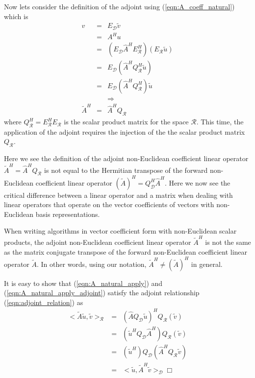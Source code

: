 Now lets consider the definition of the adjoint using (\ref{eqn:A_coeff_natural}) which is
%
\begin{eqnarray}
v
& = & E_{\mathcal{D}} \tilde{v} \nonumber \\
& = & A^H u \nonumber \\
& = & ( E_{\mathcal{D}} \hat{A}^H E_{\mathcal{R}}^H ) ( E_{\mathcal{R}} \tilde{u} ) \nonumber \\
& = & E_{\mathcal{D}} ( \hat{A}^H Q_{\mathcal{R}}^H \tilde{u} ) \nonumber \\
& = & E_{\mathcal{D}} ( \hat{A}^H Q_{\mathcal{R}}^H ) \tilde{u} \nonumber \\
&  & \Rightarrow \nonumber \\
\tilde{A}^H & = & \hat{A}^H Q_{\mathcal{R}}
\label{eqn:A_natural_apply_adjoint}
\end{eqnarray}
%
where $Q_{\mathcal{R}}^H = E_{\mathcal{R}}^H E_{\mathcal{R}}$ is the scalar
product matrix for the space $\mathcal{R}$.  This time, the application of the
adjoint requires the injection of the the scalar product matrix
$Q_{\mathcal{R}}$.

Here we see the definition of the adjoint non-Euclidean coefficient linear
operator $\tilde{A}^H=\hat{A}^H Q_{\mathcal{R}}$ is not equal to the Hermitian
transpose of the forward non-Euclidean coefficient linear operator
$(\tilde{A})^H = Q_{\mathcal{D}}^H {}\hat{A}^H$.  Here we now see the critical
difference between a linear operator and a matrix when dealing with linear
operators that operate on the vector coefficients of vectors with
non-Euclidean basis representations.

\begin{dumb_fact}
When writing algorithms in vector coefficient form with non-Euclidean scalar
products, the adjoint non-Euclidean coefficient linear operator $\tilde{A}^H$
is not the same as the matrix conjugate transpose of the forward non-Euclidean
coefficient linear operator $\tilde{A}$.  In other words, using our notation,
$\tilde{A}^H {}\ne (\tilde{A})^H$ in general.
\end{dumb_fact}

It is easy to show that (\ref{eqn:A_natural_apply}) and
(\ref{eqn:A_natural_apply_adjoint}) satisfy the adjoint relationship
(\ref{eqn:adjoint_relation}) as
%
\begin{eqnarray}
<\tilde{A} \tilde{u}, \tilde{v}>_{\mathcal{R}}
& = & (\hat{A} Q_{\mathcal{D}} \tilde{u} )^H Q_{\mathcal{R}} (\tilde{v}) \nonumber \\
& = & ( \tilde{u}^H Q_{\mathcal{D}} \hat{A}^H ) Q_{\mathcal{R}} (\tilde{v}) \nonumber \\
& = & (\tilde{u}^H ) Q_{\mathcal{D}} ( \hat{A}^H Q_{\mathcal{R}} \tilde{v}) \nonumber \\
& = & <\tilde{u}, \tilde{A}^H \tilde{v}>_{\mathcal{D}} \Box
\label{eqn:adjoint_relation_proved}
\end{eqnarray}
%

